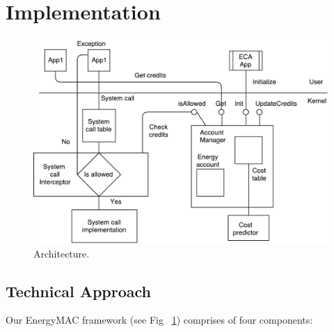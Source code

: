 \section{Implementation}\label{solution}

\begin{figure}[t]
\centering
\includegraphics[width=0.8\linewidth]{Figs/mobileapp}
\caption{Architecture.}
\label{fig:Architecture}
\centering
\end{figure}


\subsection{Technical Approach}

Our EnergyMAC framework (see Fig ~\ref{fig:Architecture}) comprises of four components:

